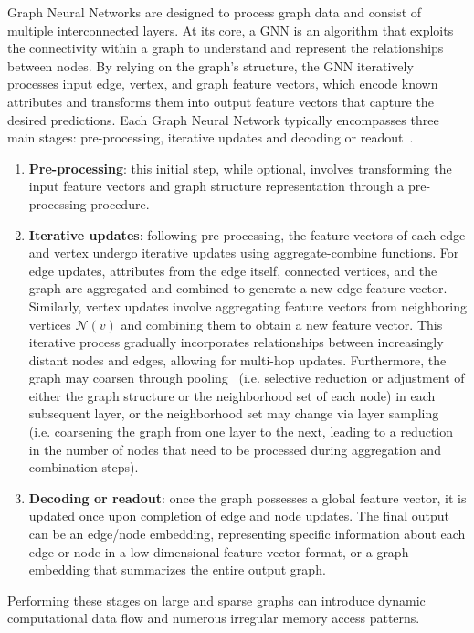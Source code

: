 Graph Neural Networks are designed to process graph data and consist of multiple interconnected layers.
At its core, a GNN is an algorithm that exploits the connectivity within a graph to understand and represent the relationships between nodes.
By relying on the graph's structure, the GNN iteratively processes input edge, vertex, and graph feature vectors, which encode known attributes and transforms them into output feature vectors that capture the desired predictions.
Each Graph Neural Network typically encompasses three main stages: pre-processing, iterative updates and decoding or readout~\cite{DBLP:journals/corr/abs-2010-00130}.
\begin{enumerate}
    \item \textbf{Pre-processing}: this initial step, while optional, involves transforming the input feature vectors and graph structure representation through a pre-processing procedure.
    \item \textbf{Iterative updates}: following pre-processing, the feature vectors of each edge and vertex undergo iterative updates using aggregate-combine functions.
          For edge updates, attributes from the edge itself, connected vertices, and the graph are aggregated and combined to generate a new edge feature vector.
          Similarly, vertex updates involve aggregating feature vectors from neighboring vertices $\mathcal{N}(v)$ and combining them to obtain a new feature vector.
          This iterative process gradually incorporates relationships between increasingly distant nodes and edges, allowing for multi-hop updates.
          Furthermore, the graph may coarsen through pooling~\cite{DBLP:journals/corr/abs-1806-08804} (i.e. selective reduction or adjustment of either the graph structure or the neighborhood set of each node) in each subsequent layer, or the neighborhood set may change via layer sampling~\cite{DBLP:journals/corr/HamiltonYL17} (i.e. coarsening the graph from one layer to the next, leading to a reduction in the number of nodes that need to be processed during aggregation and combination steps).
    \item \textbf{Decoding or readout}: once the graph possesses a global feature vector, it is updated once upon completion of edge and node updates.
          The final output can be an edge/node embedding, representing specific information about each edge or node in a low-dimensional feature vector format, or a graph embedding that summarizes the entire output graph.
\end{enumerate}
Performing these stages on large and sparse graphs can introduce dynamic computational data flow and numerous irregular memory access patterns.

